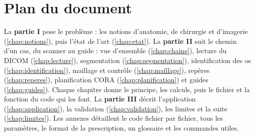 \section{Plan du document}

La \textbf{partie I} pose le problème : les notions d'anatomie, de chirurgie et d'imagerie (\cref{chap:notions}),
puis l'état de l'art (\cref{chap:etat}). La \textbf{partie II} suit le chemin d'un cas, du scanner au guide : vue
d'ensemble (\cref{chap:chaine}), lecture du DICOM (\cref{chap:lecture}), segmentation (\cref{chap:segmentation}),
identification des os (\cref{chap:identification}), maillage et contrôle (\cref{chap:maillage}), repères
(\cref{chap:reperes}), planification CORA (\cref{chap:planification}) et guides (\cref{chap:guides}). Chaque chapitre
donne le principe, les calculs, puis le fichier et la fonction du code qui les font. La \textbf{partie III} décrit
l'application (\cref{chap:application}), la validation (\cref{chap:validation}), les limites et la suite
(\cref{chap:limites}). Les annexes détaillent le code fichier par fichier, tous les paramètres, le format de la
prescription, un glossaire et les commandes utiles.
